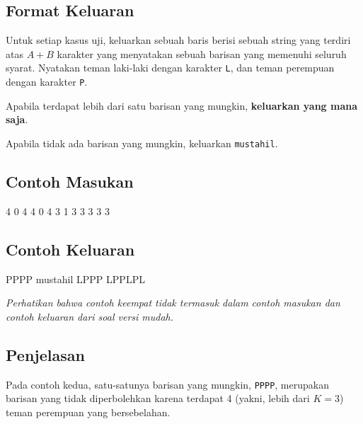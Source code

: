 \documentclass[../main_problemset.tex]{subfiles} %
\begin{document}
\subsection*{Format Keluaran}

Untuk setiap kasus uji, keluarkan sebuah baris berisi sebuah string yang terdiri atas $ A + B $ karakter yang menyatakan sebuah barisan yang memenuhi seluruh syarat. Nyatakan teman laki-laki dengan karakter \texttt{L}, dan teman perempuan dengan karakter \texttt{P}.

Apabila terdapat lebih dari satu barisan yang mungkin, \textbf{keluarkan yang mana saja}.

Apabila tidak ada barisan yang mungkin, keluarkan \texttt{mustahil}.

\vspace{.4cm}

\begin{minipage}[t]{0.5\textwidth}
\subsection*{Contoh Masukan}

\begin{lcverbatim}
4
0 4 4
0 4 3
1 3 3
3 3 3
\end{lcverbatim}
\end{minipage}
\begin{minipage}[t]{0.5\textwidth}
\subsection*{Contoh Keluaran}

\begin{lcverbatim}
PPPP
mustahil
LPPP
LPPLPL
\end{lcverbatim}
\end{minipage}

\textit{Perhatikan bahwa contoh keempat tidak termasuk dalam contoh masukan dan contoh keluaran dari soal versi mudah.}

\subsection*{Penjelasan}

Pada contoh kedua, satu-satunya barisan yang mungkin, \texttt{PPPP}, merupakan barisan yang tidak diperbolehkan karena terdapat 4 (yakni, lebih dari $ K=3 $) teman perempuan yang bersebelahan.
\end{document}
